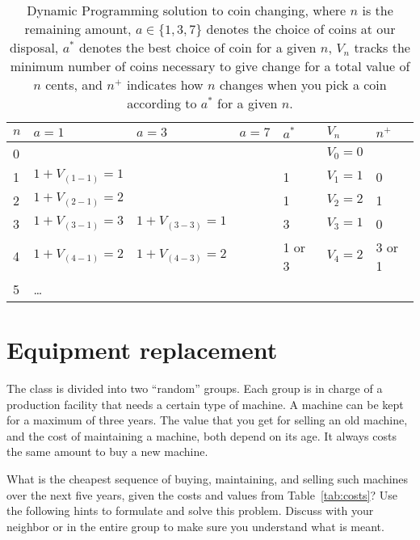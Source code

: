 \documentclass[a4paper]{article}
\begin{document}
\begin{table}
  \caption{
    Dynamic Programming solution to coin changing, where
    $n$ is the remaining amount,
    $a\in\{1,3,7\}$ denotes the choice of coins at our disposal,
    $a^\ast$ denotes the best choice of coin for a given $n$,
    $V_n$ tracks the minimum number of coins necessary to give change for a total value of $n$ cents,
    and $n^+$ indicates how $n$ changes when you pick a coin according to $a^\ast$ for a given $n$.
  }\label{tab:coin}
  \centering
  \begin{tabular}{*7{l}}
    \toprule
    $n$ & $a=1$      & $a=3$        & $a=7$ & $a^\ast$ & $V_n$ & $n^+$  \\
    \midrule
    0 &              &              &       &          & $V_0=0$ &        \\
    1 & $1+V_{(1-1)}=1$ &              &       & 1        & $V_1=1$ & 0      \\
    2 & $1+V_{(2-1)}=2$ &              &       & 1        & $V_2=2$ & 1      \\
    3 & $1+V_{(3-1)}=3$ & $1+V_{(3-3)}=1$ &       & 3        & $V_3=1$ & 0      \\
    4 & $1+V_{(4-1)}=2$ & $1+V_{(4-3)}=2$ &       & 1 or 3   & $V_4=2$ & 3 or 1 \\
    5 & \ldots \\
    \bottomrule
  \end{tabular}
\end{table}

\pagebreak

\section{Equipment replacement}

The class is divided into two ``random'' groups.
Each group is in charge of a production facility that needs a certain type of machine.
A machine can be kept for a maximum of three years.
The value that you get for selling an old machine, and the cost of maintaining a machine, both depend on its age.
It always costs the same amount to buy a new machine.

What is the cheapest sequence of buying, maintaining, and selling such machines over the next five years, given the costs and values from Table~\ref{tab:costs}?
Use the following hints to formulate and solve this problem.
Discuss with your neighbor or in the entire group to make sure you understand what is meant.
\end{document}
